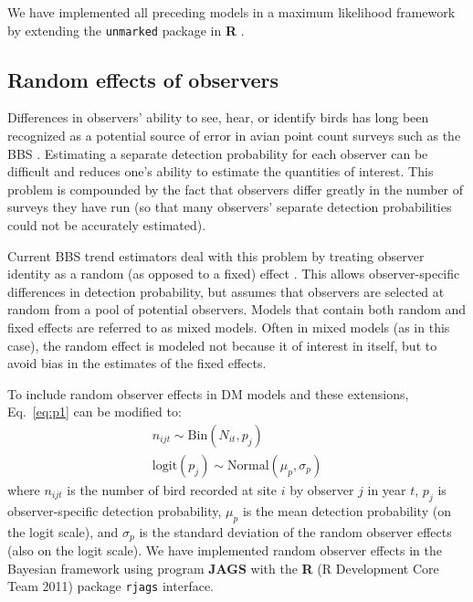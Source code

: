 \documentclass[12pt]{article}
\begin{document}
We have implemented all preceding models in
a maximum likelihood framework by extending the \texttt{unmarked} package
\citep{fiske_chandler:2011} in \textbf{R} \citep{R-2012}.

\subsection{Random effects of observers}

Differences in observers' ability to see, hear, or identify
birds has long been recognized as a potential source of error
in avian point count surveys such as the BBS
\citep{robbins_etal:1986,diefenbach_etal:2003,sauer_etal:1994auk,alldredge_etal:2007auk,campbell_francis:2011}.
Estimating a separate detection probability for each observer can be
difficult and reduces one's ability to estimate the quantities
of interest.  This problem is compounded by the fact that
observers differ greatly in the number of surveys they have
run (so that many observers' separate detection probabilities
could not be accurately estimated).

Current BBS trend estimators deal with this problem by
treating observer identity as a random (as opposed to a fixed)
effect \citep{link_sauer:2002,sauer_link:2011}.
This allows observer-specific differences in detection probability,
but assumes that observers are selected at random from a pool
of potential observers.  Models that contain both random and
fixed effects are referred to as mixed models.  Often in mixed
models (as in this case), the random effect is modeled not
because it of interest in itself, but to avoid bias in the
estimates of the fixed effects.

To include random observer effects in DM models and these extensions,
Eq.~\ref{eq:p1} can be modified to:
\begin{gather}
n_{ijt} \sim \mathrm{Bin}(N_{it}, p_j) \nonumber \\
\mathrm{logit}(p_j) \sim \mathrm{Normal}(\mu_p, \sigma_p)
\label{eq:pobs}
\end{gather}
where $n_{ijt}$ is the number of bird recorded at site $i$ by observer $j$ in
year $t$, $p_j$ is observer-specific detection probability, $\mu_p$ is the mean
detection probability (on the logit scale), and $\sigma_p$ is the standard
deviation of the random observer effects (also on the logit scale).
We have implemented random observer effects in the Bayesian framework
using program \textbf{JAGS} \citep[version 3.2.0]{plummer:2003}
with the \textbf{R} (R
Development Core Team 2011) package \texttt{rjags} \citep{plummer:2011}
interface.
\end{document}
